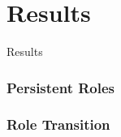 \section{Results}

\begin{frame}
\begin{center}
     	\huge Results
     \end{center}
\end{frame}

\begin{frame}
\frametitle{Persistent Roles}
\end{frame}

\begin{frame}
\frametitle{Role Transition}
\end{frame}
